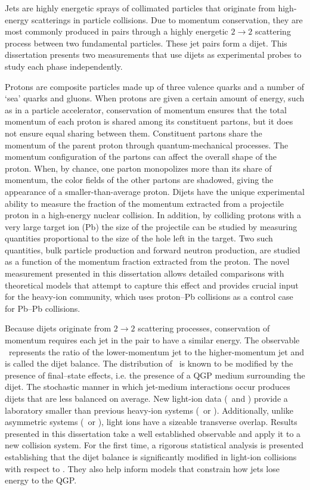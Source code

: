 Jets are highly energetic sprays of collimated particles that originate from high-energy scatterings in particle collisions. Due to momentum conservation, they are most commonly produced in pairs through a highly energetic $2\rightarrow 2$ scattering process between two fundamental particles. These jet pairs form a dijet. This dissertation presents two measurements that use dijets as experimental probes to study each phase independently.

Protons are composite particles made up of three valence quarks and a number of `sea' quarks and gluons.
When protons are given a certain amount of energy, such as in a particle accelerator, conservation of momentum ensures that the total momentum of each proton is shared among its constituent partons, but it does not ensure equal sharing between them.
Constituent partons share the momentum of the parent proton through quantum-mechanical processes.
The momentum configuration of the partons can affect the overall shape of the proton.
When, by chance, one parton monopolizes more than its share of momentum, the color fields of the other partons are shadowed, giving the appearance of a smaller-than-average proton.
Dijets have the unique experimental ability to measure the fraction of the momentum extracted from a projectile proton in a high-energy nuclear collision.
In addition, by colliding protons with a very large target ion (Pb) the size of the projectile can be studied by measuring quantities proportional to the size of the hole left in the target.
Two such quantities, bulk particle production and forward neutron production, are studied as a function of the momentum fraction extracted from the proton.
The novel measurement presented in this dissertation allows detailed comparisons with theoretical models that attempt to capture this effect and provides crucial input for the heavy-ion community, which uses proton--Pb collisions as a control case for Pb--Pb collisions.

Because dijets originate from $2\rightarrow 2$ scattering processes, conservation of momentum requires each jet in the pair to have a similar energy.
The observable \XJ\ represents the ratio of the lower-momentum jet to the higher-momentum jet and is called the dijet balance.
The distribution of \XJ\ is known to be modified by the presence of final--state effects, i.e. the presence of a QGP medium surrounding the dijet.
The stochastic manner in which jet-medium interactions occur produces dijets that are less balanced on average.
New light-ion data (\OxO\ and \NexNe) provide a laboratory smaller than previous heavy-ion systems (\PbxPb\ or \AuxAu).
Additionally, unlike asymmetric systems (\pxPb\ or \dxAu), light ions have a sizeable transverse overlap.
Results presented in this dissertation take a well established observable and apply it to a new collision system.
For the first time, a rigorous statistical analysis is presented establishing that the dijet balance is significantly modified in light-ion collisions with respect to \pxp.
They also help inform models that constrain how jets lose energy to the QGP.

